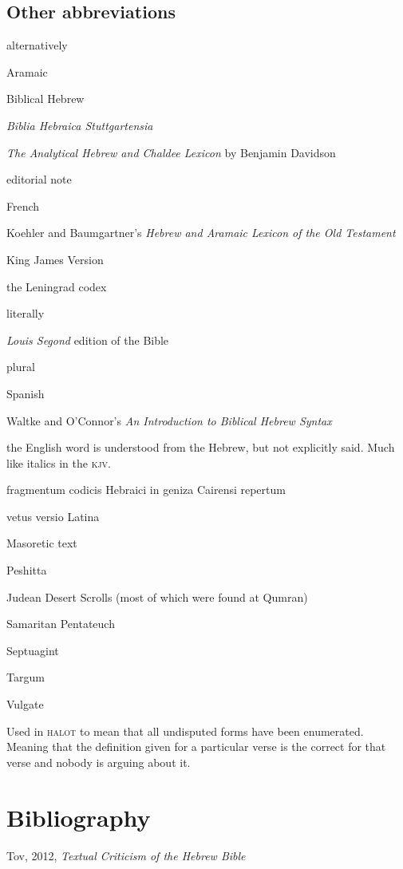 \subsection{Other abbreviations}
\begin{description}[labelsep=3em, font=\normalfont, itemsep=-0.25em]
    \item[\textsc{alt}] alternatively
    \item[Aram.] Aramaic
    \item[\textsc{bh}] Biblical Hebrew
    \item[\textsc{bhs}] \textit{Biblia Hebraica Stuttgartensia}
    \item[Davidson] \textit{The Analytical Hebrew and Chaldee Lexicon} by Benjamin Davidson
    \item[\textsc{ed}] editorial note
    \item[Fr.] French
    \item[\textsc{halot}] Koehler and Baumgartner's \textit{Hebrew and Aramaic Lexicon of the Old Testament}
    \item[\textsc{kjv}] King James Version
    \item[L] the Leningrad codex
    \item[\textsc{lit}] literally
    \item[\textsc{lsg}] \textit{Louis Segond} edition of the Bible
    \item[pl.] plural
    \item[Sp.] Spanish
    \item [W\&O] Waltke and O'Connor's \textit{An Introduction to Biblical Hebrew Syntax}
    \item[\textdegree\dots$\mathscr{U}$] the English word is understood from the Hebrew, but not explicitly said. Much like italics in the \textsc{kjv}.
    \item[\fragheb] fragmentum codicis Hebraici in geniza Cairensi repertum
    \item[\latina] vetus versio Latina
    \item[\masoretic] Masoretic text
    \item[\peshitta] Peshitta
    \item[\qumran] Judean Desert Scrolls (most of which were found at Qumran)
    \item[\sampen] Samaritan Pentateuch
    \item[\septuagint] Septuagint
    \item[\targum] Targum
    \item[\vulgate] Vulgate
    \item[$\dagger$] Used in \textsc{halot} to mean that all undisputed forms have been enumerated. Meaning that the definition given for a particular verse is the correct for that verse and nobody is arguing about it.
\end{description}

\section{Bibliography}
Tov, 2012, \textit{Textual Criticism of the Hebrew Bible}
